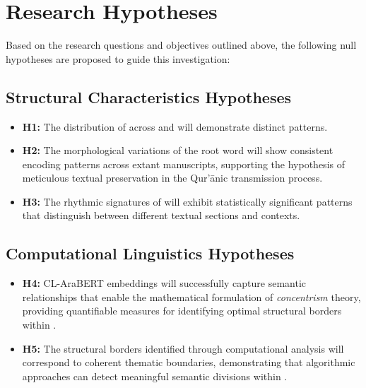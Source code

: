 \section{Research Hypotheses}\label{sec:hypotheses}

Based on the research questions and objectives outlined above, the following null hypotheses are proposed to guide this investigation:

\subsection{Structural Characteristics Hypotheses}\label{sec:hyp_structure}
\begin{itemize}
    \item \textbf{H1:} The distribution of   across   and  \newline will demonstrate distinct patterns.

    \item \textbf{H2:} The morphological variations of the root word   will show consistent encoding patterns across extant manuscripts, supporting the hypothesis of meticulous textual preservation in the Qur'\=anic transmission process.
    
    \item \textbf{H3:} The rhythmic signatures of   will exhibit statistically significant patterns that distinguish between different textual sections and contexts.
\end{itemize}

\subsection{Computational Linguistics Hypotheses}\label{sec:hyp_comp_linguist}
\begin{itemize}
    \item \textbf{H4:} CL-AraBERT embeddings will successfully capture semantic relationships that enable the mathematical formulation of \textit{concentrism} theory, providing quantifiable measures for identifying optimal structural borders within  .

    \item \textbf{H5:} The structural borders identified through computational analysis will correspond to coherent thematic boundaries, demonstrating that algorithmic approaches can detect meaningful semantic divisions within  .
\end{itemize}

